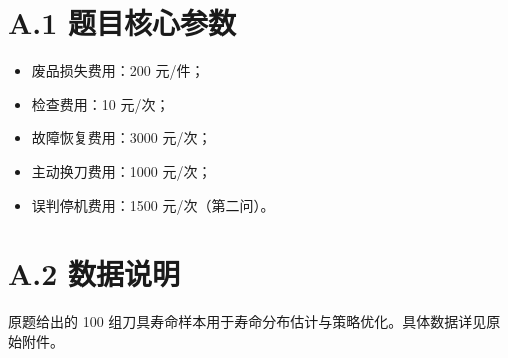 \section*{A.1 题目核心参数}
\begin{itemize}
  \item 废品损失费用：200 元/件；
  \item 检查费用：10 元/次；
  \item 故障恢复费用：3000 元/次；
  \item 主动换刀费用：1000 元/次；
  \item 误判停机费用：1500 元/次（第二问）。
\end{itemize}

\section*{A.2 数据说明}
原题给出的 100 组刀具寿命样本用于寿命分布估计与策略优化。具体数据详见原始附件。
